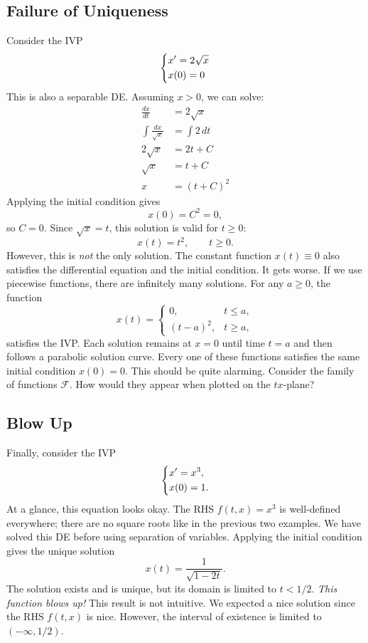 \documentclass[11pt,letterpaper]{article}
\begin{document}

\subsection{Failure of Uniqueness}
Consider the IVP
$$
\begin{dcases}
    x' = 2\sqrt{x}\\
    x(0)=0
\end{dcases}
$$
This is also a separable DE. Assuming $x>0$, we can solve:
\begin{align*}
    \frac{dx}{dt} &= 2 \sqrt{x}\\
    \int \frac{dx}{\sqrt{x}} &=  \int2\,dt\\
    2\sqrt{x} &=  2t +C\\
    \sqrt{x} & = t+C\\ 
    x &= (t+C)^2
\end{align*}
Applying the initial condition gives
\[
x(0)=C^2=0,
\]
so $C=0$. Since $\sqrt{x}=t$, this solution is valid for $t\geq0$:
\[
x(t)=t^2,\qquad t\geq0.
\]
However, this is \emph{not} the only solution. The constant function $x(t)\equiv 0$ also satisfies the differential equation and the initial condition. It gets worse. If we use piecewise functions, there are infinitely many solutions. For any $a\ge 0$, the function
\[
x(t)=
\begin{cases}
0, & t\le a,\\
(t-a)^2, & t\ge a,
\end{cases}
\]
satisfies the IVP. Each solution remains at $x=0$ until time $t=a$ and then follows a
parabolic solution curve. Every one of these functions satisfies the same
initial condition $x(0)=0$. This should be quite alarming. Consider the family of functions $\mathcal{F}$. How would they appear when plotted on the $tx$-plane?

\subsection{Blow Up}

Finally, consider the IVP
\[
\begin{dcases}
    x'=x^3,\\
    x(0)=1.
\end{dcases}
\]
At a glance, this equation looks okay. The RHS $f(t,x)=x^3$ is well-defined everywhere; there are no square roots like in the previous two examples. We have solved this DE before using separation of variables. Applying the initial condition gives the unique solution
\[
x(t)=\frac{1}{\sqrt{1-2t}}.
\]
The solution exists and is unique, but its domain is limited to $t<1/2$. \textit{This function blows up!} This result is not intuitive. We expected a nice solution since the RHS $f(t,x)$ is nice. However, the interval of existence is limited to $(-\infty,1/2)$.
\end{document}
